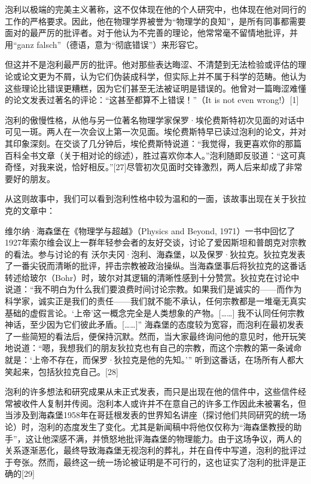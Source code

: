 泡利以极端的完美主义著称，这不仅体现在他的个人研究中，也体现在他对同行的工作的严格要求。因此，他在物理学界被誉为“物理学的良知”，是所有同事都需要面对的最严厉的批评者。对于他认为不完善的理论，他常常毫不留情地批评，并用“ganz falsch”（德语，意为“彻底错误”）来形容它。

但这并不是泡利最严厉的批评。他对那些表达晦涩、不清楚到无法检验或评估的理论或论文更为不屑，认为它们伪装成科学，但实际上并不属于科学的范畴。他认为这些理论比错误更糟糕，因为它们甚至无法被证明是错误的。他曾对一篇晦涩难懂的论文发表过著名的评论：“这甚至都算不上错误！”（It is not even wrong!）[1]  

泡利的傲慢性格，从他与另一位著名物理学家保罗·埃伦费斯特初次见面的对话中可见一斑。两人在一次会议上第一次见面。埃伦费斯特早已读过泡利的论文，并对其印象深刻。在交谈了几分钟后，埃伦费斯特说道：“我觉得，我更喜欢你的那篇百科全书文章（关于相对论的综述），胜过喜欢你本人。”泡利随即反驳道：“这可真奇怪，对我来说，恰好相反。”[27]尽管初次见面时交锋激烈，两人后来却成了非常要好的朋友。

从这则故事中，我们可以看到泡利性格中较为温和的一面，该故事出现在关于狄拉克的文章中：  

维尔纳·海森堡在《物理学与超越》（Physics and Beyond, 1971）一书中回忆了1927年索尔维会议上一群年轻参会者的友好交谈，讨论了爱因斯坦和普朗克对宗教的看法。参与讨论的有 沃尔夫冈·泡利、海森堡，以及保罗·狄拉克。狄拉克发表了一番尖锐而清晰的批评，抨击宗教被政治操纵。当海森堡事后将狄拉克的这番话转述给玻尔（Bohr）时，玻尔对其逻辑的清晰性感到十分赞赏。狄拉克在讨论中说道：“我不明白为什么我们要浪费时间讨论宗教。如果我们是诚实的——而作为科学家，诚实正是我们的责任——我们就不能不承认，任何宗教都是一堆毫无真实基础的虚假言论。‘上帝’这一概念完全是人类想象的产物。[……] 我不认同任何宗教神话，至少因为它们彼此矛盾。[……]” 海森堡的态度较为宽容，而泡利在最初发表了一些简短的看法后，便保持沉默。然而，当大家最终询问他的意见时，他开玩笑地说道：“嗯，我想我们的朋友狄拉克也有自己的宗教，而这个宗教的第一条诫命就是：‘上帝不存在，而保罗·狄拉克是他的先知。’” 听到这番话，在场所有人都大笑起来，包括狄拉克自己。[28]

泡利的许多想法和研究成果从未正式发表，而只是出现在他的信件中，这些信件经常被收件人复制并传阅。泡利本人或许并不在意自己的许多工作因此未被署名，但当涉及到海森堡1958年在哥廷根发表的世界知名讲座（探讨他们共同研究的统一场论）时，泡利的态度发生了变化。尤其是新闻稿中将他仅仅称为“海森堡教授的助手”，这让他深感不满，并愤怒地批评海森堡的物理能力。由于这场争议，两人的关系逐渐恶化，最终导致海森堡无视泡利的葬礼，并在自传中写道，泡利的批评过于夸张。然而，最终这一统一场论被证明是不可行的，这也证实了泡利的批评是正确的[29]  

